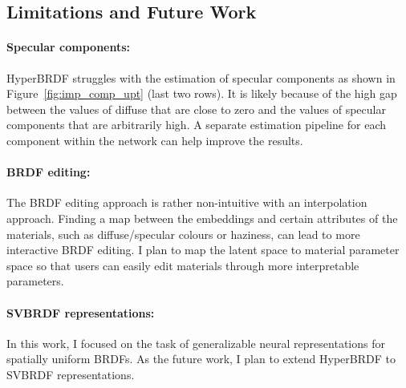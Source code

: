 \subsection{Limitations and Future Work}\label{sec:limits}
\paragraph{Specular components:} HyperBRDF struggles with the estimation of specular components as shown in Figure~\ref{fig:imp_comp_upt} (last two rows). It is likely because of the high gap between the values of diffuse that are close to zero and the values of specular components that are arbitrarily high. A separate estimation pipeline for each component within the network can help improve the results.


\paragraph{BRDF editing:} The BRDF editing approach is rather non-intuitive with an interpolation approach. Finding a map between the embeddings and certain attributes of the materials, such as diffuse/specular colours or haziness, can lead to more interactive BRDF editing. I plan to map the latent space to material parameter space so that users can easily edit materials through more interpretable parameters.

\paragraph{SVBRDF representations:} In this work, I focused on the task of generalizable neural representations for spatially uniform BRDFs. As the future work, I plan to extend HyperBRDF to SVBRDF representations.
